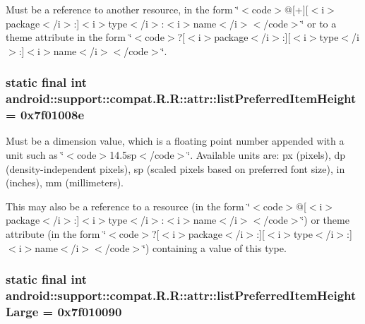 Must be a reference to another resource, in the form \char`\"{}$<$code$>$@\mbox{[}+\mbox{]}\mbox{[}$<$i$>$package$<$/i$>$:\mbox{]}$<$i$>$type$<$/i$>$:$<$i$>$name$<$/i$>$$<$/code$>$\char`\"{} or to a theme attribute in the form \char`\"{}$<$code$>$?\mbox{[}$<$i$>$package$<$/i$>$:\mbox{]}\mbox{[}$<$i$>$type$<$/i$>$:\mbox{]}$<$i$>$name$<$/i$>$$<$/code$>$\char`\"{}. \hypertarget{classandroid_1_1support_1_1compat_1_1_r_1_1attr_b2f21110871c0c497f4c67b930e054d6}{
\subsubsection[{listPreferredItemHeight}]{\setlength{\rightskip}{0pt plus 5cm}static final int android::support::compat.R.R::attr::listPreferredItemHeight = 0x7f01008e}}
\label{classandroid_1_1support_1_1compat_1_1_r_1_1attr_b2f21110871c0c497f4c67b930e054d6}


Must be a dimension value, which is a floating point number appended with a unit such as \char`\"{}$<$code$>$14.5sp$<$/code$>$\char`\"{}. Available units are: px (pixels), dp (density-independent pixels), sp (scaled pixels based on preferred font size), in (inches), mm (millimeters). 

This may also be a reference to a resource (in the form \char`\"{}$<$code$>$@\mbox{[}$<$i$>$package$<$/i$>$:\mbox{]}$<$i$>$type$<$/i$>$:$<$i$>$name$<$/i$>$$<$/code$>$\char`\"{}) or theme attribute (in the form \char`\"{}$<$code$>$?\mbox{[}$<$i$>$package$<$/i$>$:\mbox{]}\mbox{[}$<$i$>$type$<$/i$>$:\mbox{]}$<$i$>$name$<$/i$>$$<$/code$>$\char`\"{}) containing a value of this type. \hypertarget{classandroid_1_1support_1_1compat_1_1_r_1_1attr_25edf3a92abc25863ac133cb721958c6}{
\subsubsection[{listPreferredItemHeightLarge}]{\setlength{\rightskip}{0pt plus 5cm}static final int android::support::compat.R.R::attr::listPreferredItemHeightLarge = 0x7f010090}}
\label{classandroid_1_1support_1_1compat_1_1_r_1_1attr_25edf3a92abc25863ac133cb721958c6}



